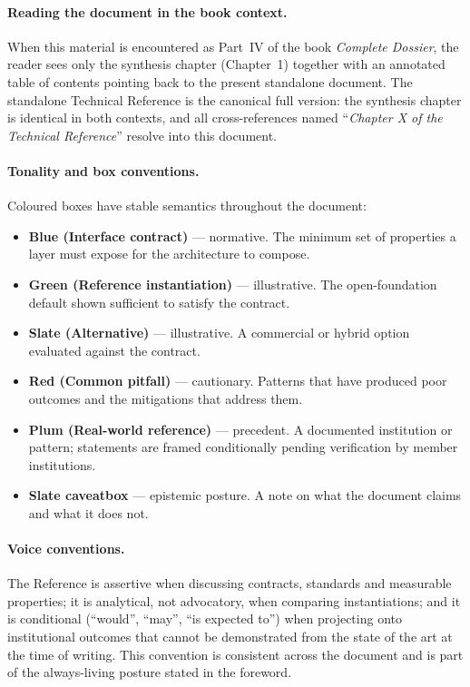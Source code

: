 \paragraph{Reading the document in the book context.} When this
material is encountered as Part~IV of the book \emph{Complete
Dossier}, the reader sees only the synthesis chapter (Chapter~1)
together with an annotated table of contents pointing back to the
present standalone document. The standalone Technical Reference
is the canonical full version: the synthesis chapter is identical
in both contexts, and all cross-references named ``\emph{Chapter
X of the Technical Reference}'' resolve into this document.

\paragraph{Tonality and box conventions.} Coloured boxes have
stable semantics throughout the document:
\begin{itemize}[leftmargin=1.5em,nosep]
  \item \textbf{Blue (Interface contract)} --- normative. The
    minimum set of properties a layer must expose for the
    architecture to compose.
  \item \textbf{Green (Reference instantiation)} --- illustrative.
    The open-foundation default shown sufficient to satisfy the
    contract.
  \item \textbf{Slate (Alternative)} --- illustrative. A
    commercial or hybrid option evaluated against the contract.
  \item \textbf{Red (Common pitfall)} --- cautionary. Patterns
    that have produced poor outcomes and the mitigations that
    address them.
  \item \textbf{Plum (Real-world reference)} --- precedent. A
    documented institution or pattern; statements are framed
    conditionally pending verification by member institutions.
  \item \textbf{Slate caveatbox} --- epistemic posture. A note
    on what the document claims and what it does not.
\end{itemize}

\paragraph{Voice conventions.} The Reference is assertive when
discussing contracts, standards and measurable properties; it is
analytical, not advocatory, when comparing instantiations; and
it is conditional (``would'', ``may'', ``is expected to'') when
projecting onto institutional outcomes that cannot be
demonstrated from the state of the art at the time of writing.
This convention is consistent across the document and is part of
the always-living posture stated in the foreword.

\newpage
